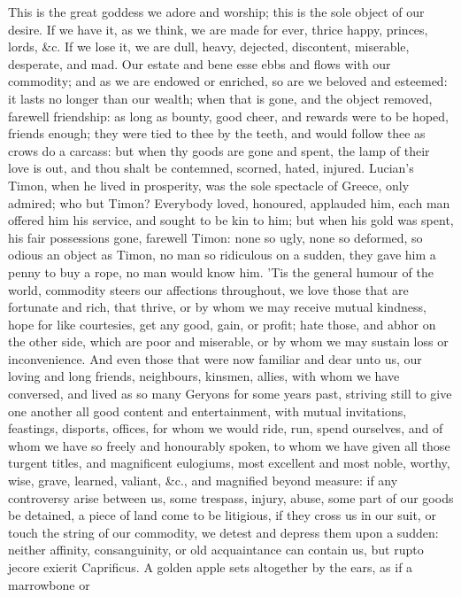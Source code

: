 {This is the great goddess we adore and worship; this is the sole object
of our desire. If we have it, as we think, we are made for ever, thrice
happy, princes, lords, \&c. If we lose it, we are dull, heavy, dejected,
discontent, miserable, desperate, and mad. Our estate and bene esse
ebbs and flows with our commodity; and as we are endowed or enriched,
so are we beloved and esteemed: it lasts no longer than our wealth;
when that is gone, and the object removed, farewell friendship: as long
as bounty, good cheer, and rewards were to be hoped, friends enough;
they were tied to thee by the teeth, and would follow thee as crows do
a carcass: but when thy goods are gone and spent, the lamp of their
love is out, and thou shalt be contemned, scorned, hated, injured.
Lucian's Timon, when he lived in prosperity, was the sole
spectacle of Greece, only admired; who but Timon? Everybody loved,
honoured, applauded him, each man offered him his service, and sought
to be kin to him; but when his gold was spent, his fair possessions
gone, farewell Timon: none so ugly, none so deformed, so odious an
object as Timon, no man so ridiculous on a sudden, they gave him a
penny to buy a rope, no man would know him.
'Tis the general humour of the world, commodity steers our affections
throughout, we love those that are fortunate and rich, that thrive, or
by whom we may receive mutual kindness, hope for like courtesies, get
any good, gain, or profit; hate those, and abhor on the other side,
which are poor and miserable, or by whom we may sustain loss or
inconvenience. And even those that were now familiar and dear unto us,
our loving and long friends, neighbours, kinsmen, allies, with whom we
have conversed, and lived as so many Geryons for some years past,
striving still to give one another all good content and entertainment,
with mutual invitations, feastings, disports, offices, for whom we
would ride, run, spend ourselves, and of whom we have so freely and
honourably spoken, to whom we have given all those turgent titles, and
magnificent eulogiums, most excellent and most noble, worthy, wise,
grave, learned, valiant, \&c., and magnified beyond measure: if any
controversy arise between us, some trespass, injury, abuse, some part
of our goods be detained, a piece of land come to be litigious, if they
cross us in our suit, or touch the string of our commodity, we detest
and depress them upon a sudden: neither affinity, consanguinity, or old
acquaintance can contain us, but rupto jecore exierit Caprificus.
A golden apple sets altogether by the ears, as if a marrowbone or
}
